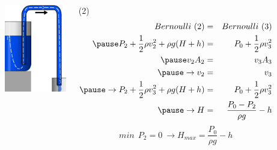 \documentclass[]{beamer}
\begin{document}
\begin{frame}


  \begin{columns}[c]
    \column{1.5in}  %
 
    \begin{center}
      \includegraphics[height=1.5in]{images2/Syphon_streamline.png}
    \end{center}

    \column{3.9in}
 
    \textcolor{mypink1}{  (2) 
    \begin{eqnarray*}
     Bernoulli~ (2)&=&Bernoulli~  (3) \\
     \pause
       P_2+\frac{1}{2}\rho v_2^2+\rho g (H+h)&=&P_0+\frac{1}{2}\rho v_3^2 \\
       \pause
       v_2A_2&=&v_3A_3\\
       \pause
       \rightarrow v_2&=&v_3\\
       \pause
       \rightarrow P_2+\frac{1}{2}\rho v_3^2+\rho g (H+h)&=&P_0+\frac{1}{2}\rho v_3^2\\
       \pause
      \rightarrow H&=& \frac{P_0-P_2}{\rho g}-h\\
    \end{eqnarray*}
    \pause
    \begin{equation*}
      min~~P_2=0~\rightarrow H_{max}=\boxed{\frac{P_0}{\rho g}-h}
    \end{equation*}
          }

    \end{columns}
 



  \end{frame}


\end{document}
